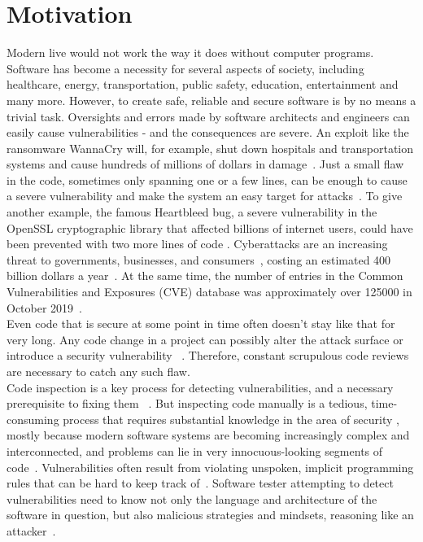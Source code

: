 \documentclass[
	a4paper,
	pagesize,
	pdftex,
	12pt,
	twoside, %
	BCOR=5mm, %
	ngerman,
	fleqn,
	final,
	]{scrartcl}
\begin{document}
\newpage
\section{Motivation}\label{Motivation}
Modern live would not work the way it does without computer programs. Software has become a necessity for several aspects of society, including healthcare, energy, transportation, public safety, education, entertainment and many more. However, to create safe, reliable and secure software is by no means a trivial task. Oversights and errors made by software architects and engineers can easily cause vulnerabilities - and the consequences are severe. An exploit like the ransomware WannaCry will, for example, shut down hospitals and transportation systems and cause hundreds of millions of dollars in damage~\cite{DanGoodin.2017}. Just a small flaw in the code, sometimes only spanning one or a few lines, can be enough to cause a severe vulnerability and make the system an easy target for attacks~\citep{Yamaguchi.2012}. To give another example, the famous Heartbleed bug, a severe vulnerability in the OpenSSL cryptographic library that affected billions of internet users, could have been prevented with two more lines of code \citep{Durumeric.2014}. Cyberattacks are an increasing threat to governments, businesses, and consumers~\cite{Dam.2017}, costing an estimated 400 billion dollars a year~\cite{Losses.2014}. At the same time, the number of entries in the Common Vulnerabilities and Exposures (CVE) database was approximately over 125000 in October 2019~\cite{CVE}.\\
Even code that is secure at some point in time often doesn't stay like that for very long. Any code change in a project can possibly alter the attack surface or introduce a security vulnerability ~\cite{Morrison.2015}. Therefore, constant scrupulous code reviews are necessary to catch any such flaw.\\
Code inspection is a key process for detecting vulnerabilities, and a necessary prerequisite to fixing them ~\cite{Yu.2019}. But inspecting code manually is a tedious, time-consuming process that requires substantial knowledge in the area of security \cite{Yamaguchi.2011}, mostly because modern software systems are becoming increasingly complex and interconnected, and problems can lie in very innocuous-looking segments of code~\cite{Pang.2015, Li.2018}. Vulnerabilities often result from violating unspoken, implicit programming rules that can be hard to keep track of~\cite{Li.2005}. Software tester attempting to detect vulnerabilities need to know not only the language and architecture of the software in question, but also malicious strategies and mindsets, reasoning like an attacker~\cite{Pang.2015}.\\
\end{document}
